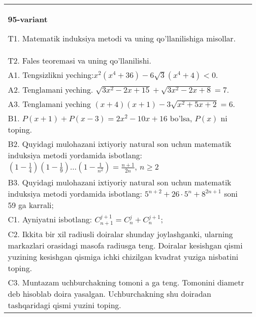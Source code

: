 \documentclass{article}
\begin{document}
\begin{tabular}{m{17cm}}
\textbf{95-variant}
\newline

T1. Matematik induksiya metodi va uning qo'llanilishiga misollar. \\
T2. Fales teoremasi va uning qo'llanilishi. \\
A1. Tengsizlikni yeching:\(x^{2}\left( x^{4} + 36 \right) - 6\sqrt{3}\left( x^{4} + 4 \right) < 0\). \\
A2. Tenglamani yeching. \(\sqrt{3x^{2} - 2x + 15} + \sqrt{3x^{2} - 2x + 8} = 7\). \\
A3. Tenglamani yeching \((x + 4)(x + 1) - 3\sqrt{x^{2} + 5x + 2} = 6\). \\
B1. \(P(x + 1) + P(x - 3) = 2x^{2} - 10x + 16\) bo'lsa, \(P(x)\) ni toping. \\
B2. Quyidagi mulohazani ixtiyoriy natural son uchun matematik induksiya metodi yordamida isbotlang: \(\left( 1 - \frac{1}{4} \right)\left( 1 - \frac{1}{9} \right)...\left( 1 - \frac{1}{n^{2}} \right) = \frac{n + 1}{2n}\), \(n \geq 2\) \\
B3. Quyidagi mulohazani ixtiyoriy natural son uchun matematik induksiya metodi yordamida isbotlang: \(5^{n + 2} + 26 \cdot 5^{n} + 8^{2n + 1}\) soni 59 ga karrali; \\
C1. Ayniyatni isbotlang: \(C_{n + 1}^{j + 1} = C_{n}^{j} + C_{n}^{j + 1}\); \\
C2. Ikkita bir xil radiusli doiralar shunday joylashganki, ularning markazlari orasidagi masofa radiusga teng. Doiralar kesishgan qismi yuzining kesishgan qismiga ichki chizilgan kvadrat yuziga nisbatini toping. \\
C3. Muntazam uchburchakning tomoni a ga teng. Tomonini diametr deb hisoblab doira yasalgan. Uchburchakning shu doiradan tashqaridagi qismi yuzini toping. \\

\end{tabular}
\vspace{1cm}
\end{document}
